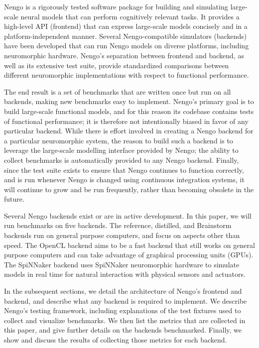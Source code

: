 \documentclass{frontiersSCNS}
\begin{document}
Nengo is a rigorously tested software package
for building and simulating
large-scale neural models
that can perform cognitively relevant tasks.
It provides a high-level API (frontend)
that can express large-scale models concisely
and in a platform-independent manner.
Several Nengo-compatible simulators (backends)
have been developed that can
run Nengo models on diverse platforms,
including neuromorphic hardware.
Nengo's separation between frontend and backend,
as well as its extensive test suite,
provide standardized comparisons
between different neuromorphic implementations
with respect to functional performance.

The end result is a set of benchmarks that
are written once but run on all backends,
making new benchmarks easy to implement.
Nengo's primary goal is to
build large-scale functional models,
and for this reason its codebase contains
tests of functional performance;
it is therefore not intentionally
biased in favor of any particular backend.
While there is effort involved in creating
a Nengo backend for a particular neuromorphic system,
the reason to build such a backend
is to leverage the large-scale modelling interface
provided by Nengo;
the ability to collect benchmarks
is automatically provided to any Nengo backend.
Finally, since the test suite exists
to ensure that Nengo continues to function
correctly, and is run whenever Nengo is changed using
continuous integration systems,
it will continue to grow and be run frequently,
rather than becoming obsolete in the future.

Several Nengo backends exist or are in active development.
In this paper, we will run benchmarks
on five backends.
The reference, distilled, and Brainstorm backends
run on general purpose computers,
and focus on aspects other than speed.
The OpenCL backend aims to be a fast backend
that still works on general purpose computers
and can take advantage of
graphical processing units (GPUs).
The SpiNNaker backend uses
SpiNNaker neuromorphic hardware to
simulate models in real time
for natural interaction with
physical sensors and actuators.

In the subsequent sections,
we detail the architecture of Nengo's
frontend and backend,
and describe what any backend
is required to implement.
We describe Nengo's testing framework,
including explanations of the test fixtures
used to collect and visualize benchmarks.
We then list the metrics
that are collected in this paper,
and give further details on the backends benchmarked.
Finally, we show and discuss
the results of collecting those metrics
for each backend.
\end{document}

